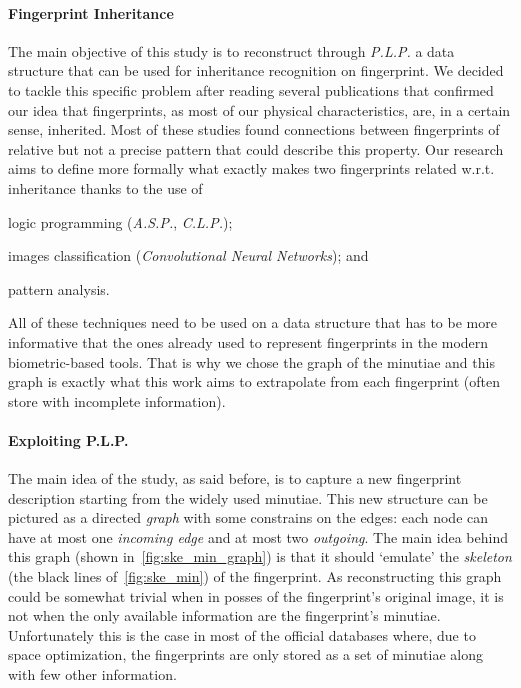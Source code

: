 \documentclass[8pt]{article}
\begin{document}
  \paragraph{Fingerprint Inheritance}\label{par:heredity}
  The main objective of this study is to reconstruct through \textit{P.L.P.} a data structure that can be used for inheritance recognition on fingerprint.
  We decided to tackle this specific problem after reading several publications that confirmed our idea that fingerprints, as most of our physical characteristics, are, in a certain sense, inherited.
  Most of these studies found connections between fingerprints of relative but not a precise pattern that could describe this property.
  Our research aims to define more formally what exactly makes two fingerprints related w.r.t. inheritance thanks to the use of
  \begin{enumerate*}[label=\roman*)]
  	\item logic programming (\textit{A.S.P.}, \textit{C.L.P.});
  	\item images classification (\textit{Convolutional Neural Networks}); and
  	\item pattern analysis.
  \end{enumerate*}
	All of these techniques need to be used on a data structure that has to be more informative that the ones already used to represent fingerprints in the modern biometric-based tools. That is why we chose the graph of the minutiae and this graph is exactly what this work aims to extrapolate from each fingerprint (often store with incomplete information).
  
  \paragraph{Exploiting P.L.P.}
    The main idea of the study, as said before, is to capture a new fingerprint description starting from the widely used minutiae.
    This new structure can be pictured as a directed \textit{graph} with some constrains on the edges: each node can have at most one \textit{incoming edge} and at most two \textit{outgoing}.
    The main idea behind this graph (shown in~\cref{fig:ske_min_graph}) is that it should \textquoteleft emulate' the \textit{skeleton} (the black lines of~\cref{fig:ske_min}) of the fingerprint.
    As reconstructing this graph could be somewhat trivial when in posses of the fingerprint's original image, it is not when the only available information are the fingerprint's minutiae.
    Unfortunately this is the case in most of the official databases where, due to space optimization, the fingerprints are only stored as a set of minutiae along with few other information.
    
\end{document}

